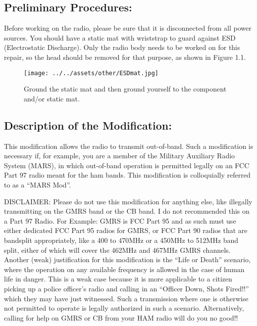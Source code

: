 \documentclass{report}
\begin{document}
\begin{center}
    \chapter{\textbf{Preliminary Procedures:}}  %
\end{center}

\hspace{\parindent}Before working on the radio, please be sure that it is disconnected from all power sources. You
should have a static mat with wriststrap to guard against ESD (Electrostatic Discharge). Only the radio body needs 
to be worked on for this repair, so the head should be removed for that purpose, as shown in Figure 1.1.

\begin{figure}[H] %
    \centering %
    \texttt{[image: ../../assets/other/ESDmat.jpg]} %
    \caption{Ground the static mat and then ground yourself to the component and/or static mat.} %
\end{figure}

\begin{center}
    \chapter{\textbf{Description of the Modification:}}
\end{center}

\hspace{\parindent}This modification allows the radio to transmit out-of-band. Such a modification
is necessary if, for example, you are a member of the Military Auxiliary Radio System (MARS), in which out-of-band 
operation is permitted legally on an FCC Part 97 radio meant for the ham bands. This modification is colloquially 
referred to as a ``MARS Mod''.

\hspace{\parindent}DISCLAIMER: Please do not use this modification for anything else, like illegally transmitting 
on the GMRS band or the CB band. I do not recommended this on a Part 97 Radio. For Example: GMRS is FCC Part 95 
and as such must use either dedicated FCC Part 95 radios for GMRS, or FCC Part 90 radios that are bandsplit 
appropriately, like a 400 to 470MHz or a 450MHz to 512MHz band split, either of which will cover the 462MHz and 
467MHz GMRS channels. Another (weak) justification for this modification is the ``Life or Death'' scenario, where 
the operation on any available frequency is allowed in the case of human life in danger. This is a weak case 
because it is more applicable to a citizen picking up a police officer's radio and calling in an ``Officer 
Down, Shots Fired!!'' which they may have just witnessed. Such a transmission where one is otherwise not 
permitted to operate is legally authorized in such a scenario. Alternatively, calling for help on GMRS or CB from 
your HAM radio will do you no good!!
\end{document}
